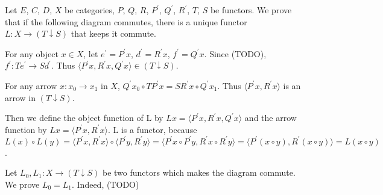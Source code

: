 \documentclass{article}
\begin{document}
\showArt

Let $E$, $C$, $D$, $X$ be categories, $P$, $Q$, $R$, $P^\prime$, $Q^\prime$, $R^\prime$, $T$, $S$ be functors. We prove that if the following diagram commutes, there is a unique functor $L : X \rightarrow (T \downarrow S)$ that keeps it commute.

\begin{center}
\end{center}

For any object $x \in X$, let $e^\prime = P^\prime x$, $d^\prime = R^\prime x$, $f^\prime = Q^\prime x$. Since (TODO), $f^\prime : Te^\prime \rightarrow Sd^\prime$. Thus $\langle P^\prime x, R^\prime x, Q^\prime x \rangle \in (T \downarrow S)$.

For any arrow $x : x_0 \rightarrow x_1$ in $X$, $Q^\prime x_0 \circ TP^\prime x = SR^\prime x \circ Q^\prime x_1$. Thus $\langle P^\prime x, R^\prime x \rangle$ is an arrow in $(T \downarrow S)$.

Then we define the object function of L by $Lx = \langle P^\prime x, R^\prime x, Q^\prime x \rangle$ and the arrow function by $Lx = \langle P^\prime x, R^\prime x \rangle$. L is a functor, because $L(x) \circ L(y) = \langle P^\prime x, R^\prime x \rangle \circ \langle P^\prime y, R^\prime y \rangle = \langle P^\prime x \circ P^\prime y, R^\prime x \circ R^\prime y \rangle = \langle P^\prime (x \circ y), R^\prime (x \circ y) \rangle = L(x \circ y)$.

Let $L_0, L_1 : X \rightarrow (T \downarrow S)$ be two functors which makes the diagram commute. We prove $L_0 = L_1$. Indeed, (TODO)

\subsubsection{}

\subsection{}
\end{document}
